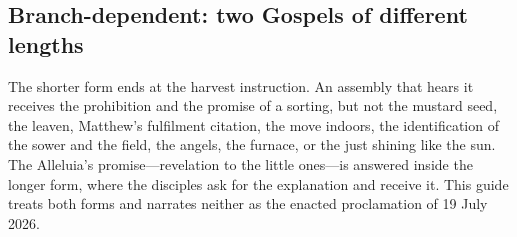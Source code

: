 \subsection*{Branch-dependent: two Gospels of different lengths}

The shorter form ends at the harvest instruction. An assembly that hears it
receives the prohibition and the promise of a sorting, but not the mustard
seed, the leaven, Matthew's fulfilment citation, the move indoors, the
identification of the sower and the field, the angels, the furnace, or the
just shining like the sun. The Alleluia's promise---revelation to the little
ones---is answered inside the longer form, where the disciples ask for the
explanation and receive it. This guide treats both forms and narrates neither
as the enacted proclamation of 19 July 2026.
